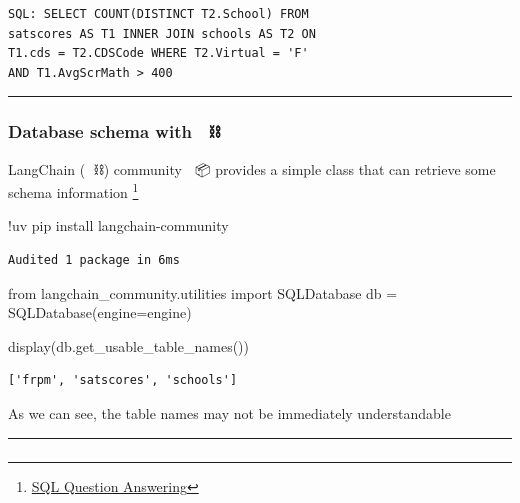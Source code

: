 \documentclass[
  letterpaper,
  DIV=11,
  numbers=noendperiod]{scrartcl}
\newenvironment{Shaded}{\begin{snugshade}}{\end{snugshade}}
\newcommand{\ImportTok}[1]{\textcolor[rgb]{0.00,0.46,0.62}{#1}}
\newcommand{\NormalTok}[1]{\textcolor[rgb]{0.00,0.23,0.31}{#1}}
\newcommand{\OperatorTok}[1]{\textcolor[rgb]{0.37,0.37,0.37}{#1}}
\begin{document}
\begin{verbatim}
SQL: SELECT COUNT(DISTINCT T2.School) FROM 
satscores AS T1 INNER JOIN schools AS T2 ON 
T1.cds = T2.CDSCode WHERE T2.Virtual = 'F' 
AND T1.AvgScrMath > 400
\end{verbatim}

\begin{center}\rule{0.5\linewidth}{0.5pt}\end{center}

\subsubsection{Database schema with 🦜 ⛓️}\label{database-schema-with}

LangChain (🦜 ⛓️) community 🐍 📦 provides a simple class that can
retrieve some schema information \footnote{\href{https://python.langchain.com/docs/tutorials/sql_qa/\#system-prompt}{SQL
  Question Answering}}

\begin{Shaded}
\begin{Highlighting}[]
\OperatorTok{!}\NormalTok{uv pip install langchain}\OperatorTok{{-}}\NormalTok{community}
\end{Highlighting}
\end{Shaded}

\begin{verbatim}
Audited 1 package in 6ms
\end{verbatim}

\begin{Shaded}
\begin{Highlighting}[]
\ImportTok{from}\NormalTok{ langchain\_community.utilities }\ImportTok{import}\NormalTok{ SQLDatabase}
\NormalTok{db }\OperatorTok{=}\NormalTok{ SQLDatabase(engine}\OperatorTok{=}\NormalTok{engine)}

\NormalTok{display(db.get\_usable\_table\_names())}
\end{Highlighting}
\end{Shaded}

\begin{verbatim}
['frpm', 'satscores', 'schools']
\end{verbatim}

As we can see, the table names may not be immediately understandable 🤔

\begin{center}\rule{0.5\linewidth}{0.5pt}\end{center}

\subsubsection{}\label{section}
\end{document}
